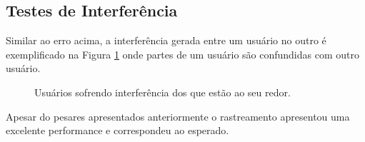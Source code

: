 	
	\subsection{Testes de Interferência}
	
		Similar ao erro acima, a interferência gerada entre um usuário no outro é
		exemplificado na Figura \ref{fig:testes_relacionamento_com_usuarios} onde
		partes de um usuário são confundidas com outro usuário.

		\begin{figure}[H]
			\begin{center}
			\end{center}
			\caption{Usuários sofrendo interferência dos que estão ao seu redor.}
			\label{fig:testes_relacionamento_com_usuarios}
		\end{figure}
		
		
Apesar do pesares apresentados anteriormente o rastreamento apresentou uma
excelente performance e correspondeu ao esperado. 
	